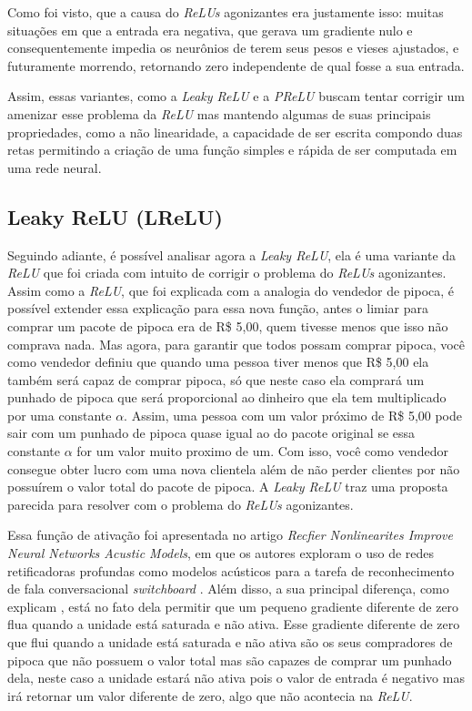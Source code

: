 Como foi visto, que a causa do \textit{ReLUs} agonizantes era justamente isso: muitas situações em que a entrada era negativa, que gerava um gradiente nulo e consequentemente impedia os neurônios de terem seus pesos e vieses ajustados, e futuramente morrendo, retornando zero independente de qual fosse a sua entrada.

Assim, essas variantes, como a \textit{Leaky ReLU} e a \textit{PReLU} buscam tentar corrigir um amenizar esse problema da \textit{ReLU} mas mantendo algumas de suas principais propriedades, como a não linearidade, a capacidade de ser escrita compondo duas retas permitindo a criação de uma função simples e rápida de ser computada em uma rede neural.

\subsection{Leaky ReLU (LReLU)}

Seguindo adiante, é possível analisar agora a \textit{Leaky ReLU}, ela é uma variante da \textit{ReLU} que foi criada com intuito de corrigir o problema do \textit{ReLUs} agonizantes. Assim como a \textit{ReLU}, que foi explicada com a analogia do vendedor de pipoca, é possível extender essa explicação para essa nova função, antes o limiar para comprar um pacote de pipoca era de R\$ 5,00, quem tivesse menos que isso não comprava nada. Mas agora, para garantir que todos possam comprar pipoca, você como vendedor definiu que quando uma pessoa tiver menos que R\$ 5,00 ela também será capaz de comprar pipoca, só que neste caso ela comprará um punhado de pipoca que será proporcional ao dinheiro que ela tem multiplicado por uma constante $\alpha$. Assim, uma pessoa com um valor próximo de R\$ 5,00 pode sair com um punhado de pipoca quase igual ao do pacote original se essa constante $\alpha$ for um valor muito proximo de um. Com isso, você como vendedor consegue obter lucro com uma nova clientela além de não perder clientes por não possuírem o valor total do pacote de pipoca. A \textit{Leaky ReLU} traz uma proposta parecida para resolver com o problema do \textit{ReLUs} agonizantes.

Essa função de ativação foi apresentada no artigo \textit{Recfier Nonlinearites Improve Neural Networks Acustic Models}, em que os autores exploram o uso de redes retificadoras profundas como modelos acústicos para a tarefa de reconhecimento de fala conversacional \textit{switchboard} \parencite{LeakyReLUArticle}. Além disso, a sua principal diferença, como explicam \textcite{LeakyReLUArticle}, está no fato dela permitir que um pequeno gradiente diferente de zero flua quando a unidade está saturada e não ativa. Esse gradiente diferente de zero que flui quando a unidade está saturada e não ativa são os seus compradores de pipoca que não possuem o valor total mas são capazes de comprar um punhado dela, neste caso a unidade estará não ativa pois o valor de entrada é negativo mas irá retornar um valor diferente de zero, algo que não acontecia na \textit{ReLU}.

